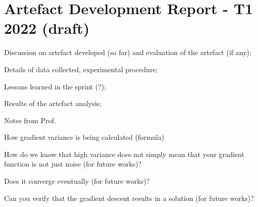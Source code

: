 \section{Artefact Development Report - T1 2022 (draft)}
\begin{todolist}
    \item[\done] Discussion on artefact developed (so far) and evaluation of the artefact (if any);
    \item[\done] Details of data collected, experimental procedure;
    \item Lessons learned in the sprint (?);
    \item[\done] Results of the artefact analysis;
\end{todolist}

Notes from Prof.

\begin{todolist}
    \item[\done] How gradient variance is being calculated (formula)
    \item[\done] How do we know that high variance does not simply mean that your gradient function is not just noise (for future works)?
    \item Does it converge eventually (for future works)?
    \item Can you verify that the gradient descent results in a solution (for future works)?
\end{todolist}






